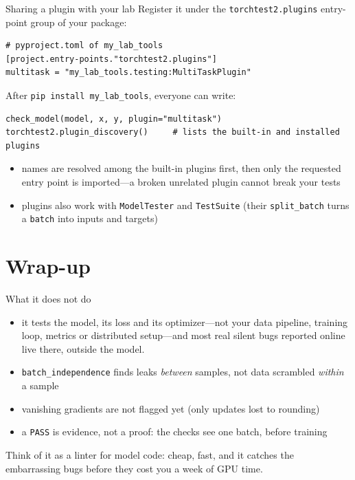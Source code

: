 \documentclass[aspectratio=169,11pt]{beamer}
\newcommand{\PASS}{\textcolor{pass}{\texttt{PASS}}}
\newcommand{\chk}[1]{\texttt{#1}}
\begin{document}
\begin{frame}[fragile]{Sharing a plugin with your lab}
  Register it under the \texttt{torchtest2.plugins} entry-point group of your package:
  \begin{lstlisting}[language={}]
# pyproject.toml of my_lab_tools
[project.entry-points."torchtest2.plugins"]
multitask = "my_lab_tools.testing:MultiTaskPlugin"
  \end{lstlisting}
  After \texttt{pip install my\_lab\_tools}, everyone can write:
  \begin{lstlisting}
check_model(model, x, y, plugin="multitask")
torchtest2.plugin_discovery()     # lists the built-in and installed plugins
  \end{lstlisting}
  \begin{itemize}
    \item names are resolved among the built-in plugins first, then only the requested entry
          point is imported---a broken unrelated plugin cannot break your tests
    \item plugins also work with \texttt{ModelTester} and \texttt{TestSuite} (their
          \texttt{split\_batch} turns a \texttt{batch} into inputs and targets)
  \end{itemize}
\end{frame}

\section{Wrap-up}

\begin{frame}{What it does not do}
  \begin{itemize}
    \item it tests the \alert{model}, its loss and its optimizer---not your data pipeline,
          training loop, metrics or distributed setup---and most real silent bugs reported
          online live there, outside the model.
    \item \chk{batch\_independence} finds leaks \emph{between} samples, not data scrambled
          \emph{within} a sample
    \item vanishing gradients are not flagged yet (only updates lost to rounding)
    \item a \PASS{} is evidence, not a proof: the checks see one batch, before training
  \end{itemize}
  \medskip
  Think of it as a \alert{linter for model code}: cheap, fast, and it catches the embarrassing
  bugs before they cost you a week of GPU time.
\end{frame}
\end{document}

